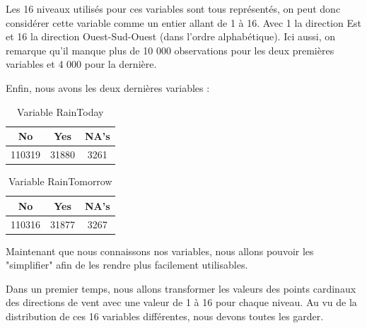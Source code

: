 \documentclass{article}
\begin{document}
\begin{table}[H]
    \centering
    \caption{Variable WindDir3pm}
\end{table}

Les 16 niveaux utilisés pour ces variables sont tous représentés, on peut donc considérer cette variable comme un entier allant de 1 à 16. Avec 1 la direction Est et 16 la direction Ouest-Sud-Ouest (dans l'ordre alphabétique). Ici aussi, on remarque qu'il manque plus de  10 000 observations pour les deux premières variables et 4 000 pour la dernière. 

Enfin, nous avons les deux dernières variables : 

\begin{table}[H]
    \centering
    \begin{tabular}{|c|c|c|}
        \hline
            No &    Yes &   NA's \\
        \hline
        110319 &  31880 &   3261 \\
        \hline
    \end{tabular}
    \caption{Variable RainToday}
\end{table}

\begin{table}[H]
    \centering
    \begin{tabular}{|c|c|c|}
        \hline
            No &    Yes &   NA's \\
        \hline
        110316 &  31877 &   3267 \\
        \hline
    \end{tabular}
    \caption{Variable RainTomorrow}
\end{table}

Maintenant que nous connaissons nos variables, nous allons pouvoir les "simplifier" afin de les rendre plus facilement utilisables. 

Dans un premier temps, nous allons transformer les valeurs des points cardinaux des directions de vent avec une valeur de 1 à 16 pour chaque niveau. Au vu de la distribution de ces 16 variables différentes, nous devons toutes les garder. 
\end{document}
